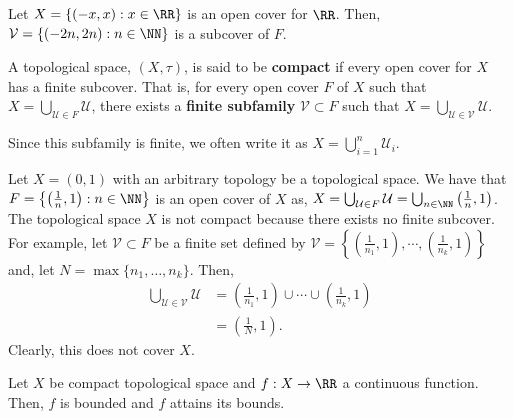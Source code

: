 \documentclass[12pt, a4paper]{article}
\begin{document}
\begin{example}
    Let \(X = \{(-x,x) : x \in \RR\}\) is an open cover for \(\RR\). Then, \(\mathcal{V} = \{(-2n,2n) : n \in \NN\}\) is a subcover of \(F\).
\end{example}

\begin{definition}
    A topological space, \((X,\tau)\), is said to be \textbf{compact} if every open cover for \(X\) has a finite subcover. That is, for every open cover \(F\) of \(X\) such that \(X = \bigcup_{\mathcal{U} \in F} \mathcal{U}\), there exists a \textbf{finite subfamily} \(\mathcal{V} \subset F\) such that \(X = \bigcup_{\mathcal{U} \in \mathcal{V}} \mathcal{U}\).
\end{definition}

\begin{mdremark}
    Since this subfamily is finite, we often write it as \(X=\bigcup_{i=1}^n \mathcal{U}_i\).
\end{mdremark}

\begin{example}
    Let \(X = (0,1)\) with an arbitrary topology be a topological space. We have that \(F= \left\{ \left( \frac{1}{n},1 \right) : n\in \NN \right\}\) is an open cover of \(X\) as, \(X= \bigcup_{\mathcal{U} \in F} \mathcal{U}=\bigcup_{n\in \NN} \left( \frac{1}{n},1 \right)\). The topological space \(X\) is not compact because there exists no finite subcover. For example, let \(\mathcal{V} \subset F\) be a finite set defined by \(\mathcal{V} = \left\{ \left( \frac{1}{n_1},1 \right), \cdots, \left( \frac{1}{n_k},1 \right)\right\}\) and, let \(N=\max\{n_1,\ldots,n_k\}\). Then,
    \[\begin{aligned}
        \bigcup_{\mathcal{U} \in \mathcal{V}} \mathcal{U} &= \left( \frac{1}{n_1},1 \right) \cup \cdots \cup \left( \frac{1}{n_k},1 \right)  \\
        &= \left( \frac{1}{N},1 \right).
    \end{aligned}\]
    Clearly, this does not cover \(X\).
\end{example}

\begin{mdthm}
    Let \(X\) be compact topological space and \(f :X \to \RR\) a continuous function. Then, \(f\) is bounded and \(f\) attains its bounds.
\end{mdthm}
\end{document}
